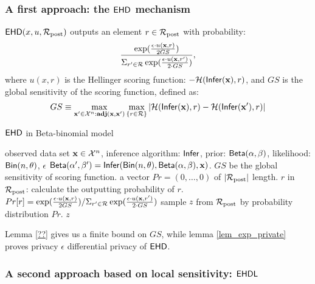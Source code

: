 \documentclass{article}
\begin{document}
\subsubsection{A first approach: the $\mathsf{EHD}$ mechanism}
$\mathsf{EHD}(x,u,\mathcal{R}_{\textup{post}})$  outputs an element $r\in\mathcal{R}_{\textup{post}}$ with  probability: %
\[
\frac
  {\exp(\frac{\epsilon\cdot u(\textbf{x}, {r})}{2 GS})}
{\Sigma_{r' \in \mathcal{R}}\exp(\frac{\epsilon\cdot u(\textbf{x}, {r'})}{2\cdot GS})},
\]
where $u(x,r)$ is the Hellinger scoring function: $-\mathcal{H}(\mathsf{Infer}(\textbf{x}), r)$, and $GS$ is the global sensitivity of the scoring function, defined as:
\begin{equation*}
GS \equiv 
\max_{\textbf{x}' \in \mathcal{X}^n: \\ \textbf{adj}(\textbf{x},\textbf{x}')}\max_{\{r\in \mathcal{R}\}}
|\mathcal{H}(\mathsf{Infer}(\textbf{x}), r) - \mathcal{H}(\mathsf{Infer}(\textbf{x}'), r)|
\end{equation*}
%
  \begin{algorithm}
  \caption{$\mathsf{EHD}$ in Beta-binomial model}
  \label{mech:expmech}
  \begin{algorithmic}
  \INPUT observed data set $\textbf{x} \in \mathcal{X}^n$, inference algorithm: $\mathsf{Infer}$, 
  prior: $\mathsf{Beta}(\alpha, \beta)$, likelihood: $\mathsf{Bin}(n, \theta)$, $\epsilon$
  \STATE {} $\mathsf{Beta}(\alpha', \beta') = \mathsf{Infer}(\mathsf{Bin}(n, \theta), \mathsf{Beta}(\alpha, \beta), \textbf{x})$. $GS$ be the global sensitivity of scoring function.  
  \STATE {} a vector $Pr = (0, \dots, 0 )$ of $|\mathcal{R}_{\textup{post}}|$ length.
  \STATE {} $r$ in $\mathcal{R}_{\textup{post}}$:
  \STATE \quad \quad calculate the outputting probability of $r$.
  \STATE \quad \quad $Pr[r] = 
  {\exp(\frac{\epsilon\cdot u(\textbf{x}, {r})}{2 GS})}
/ {\Sigma_{r' \in \mathcal{R}}\exp(\frac{\epsilon\cdot u(\textbf{x}, r')}{2\cdot GS})}$
\STATE \quad sample $z$ from $\mathcal{R}_{\textup{post}}$ by probability distribution $Pr$.
   $z$
  \end{algorithmic}
  \end{algorithm}

Lemma \ref{??} gives us a finite bound on $GS$, while lemma \ref{lem_exp_private} proves privacy $\epsilon$ differential privacy of $\mathsf{EHD}$.


\subsubsection{A second approach based on local sensitivity: $\mathsf{EHDL}$}
\label{subsec_emls}
\end{document}
